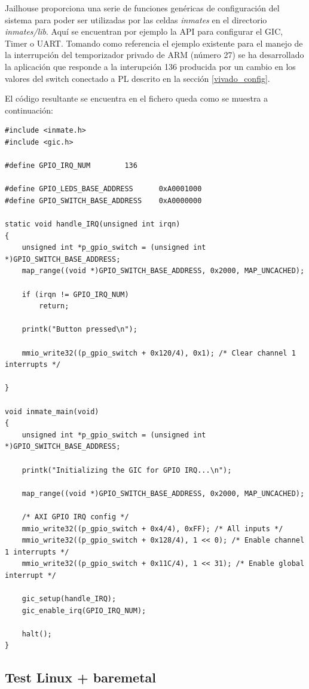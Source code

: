 Jailhouse proporciona una serie de funciones genéricas de configuración del sistema para poder ser utilizadas por las celdas \textit{inmates} en el directorio \textit{inmates/lib}. Aquí se encuentran por ejemplo la API para configurar el \acrshort{GIC}, Timer o \acrshort{UART}. Tomando como referencia el ejemplo existente para el manejo de la interrupción del temporizador privado de ARM (número 27) se ha desarrollado la aplicación que responde a la interupción 136 producida por un cambio en los valores del switch conectado a \acrshort{PL} descrito en la sección \ref{vivado_config}.

El código resultante se encuentra en el fichero queda como se muestra a continuación:
\begin{lstlisting}[style=CStyle]
#include <inmate.h>
#include <gic.h>

#define GPIO_IRQ_NUM		136

#define GPIO_LEDS_BASE_ADDRESS  	0xA0001000
#define GPIO_SWITCH_BASE_ADDRESS  	0xA0000000

static void handle_IRQ(unsigned int irqn)
{
    unsigned int *p_gpio_switch = (unsigned int *)GPIO_SWITCH_BASE_ADDRESS;
    map_range((void *)GPIO_SWITCH_BASE_ADDRESS, 0x2000, MAP_UNCACHED);

	if (irqn != GPIO_IRQ_NUM)
		return;

	printk("Button pressed\n");

    mmio_write32((p_gpio_switch + 0x120/4), 0x1); /* Clear channel 1 interrupts */

}

void inmate_main(void)
{
	unsigned int *p_gpio_switch = (unsigned int *)GPIO_SWITCH_BASE_ADDRESS;

	printk("Initializing the GIC for GPIO IRQ...\n");

    map_range((void *)GPIO_SWITCH_BASE_ADDRESS, 0x2000, MAP_UNCACHED);

	/* AXI GPIO IRQ config */
	mmio_write32((p_gpio_switch + 0x4/4), 0xFF); /* All inputs */
	mmio_write32((p_gpio_switch + 0x128/4), 1 << 0); /* Enable channel 1 interrupts */
	mmio_write32((p_gpio_switch + 0x11C/4), 1 << 31); /* Enable global interrupt */

	gic_setup(handle_IRQ);
	gic_enable_irq(GPIO_IRQ_NUM);

	halt();
}
\end{lstlisting}

\subsection{Test Linux + baremetal}

